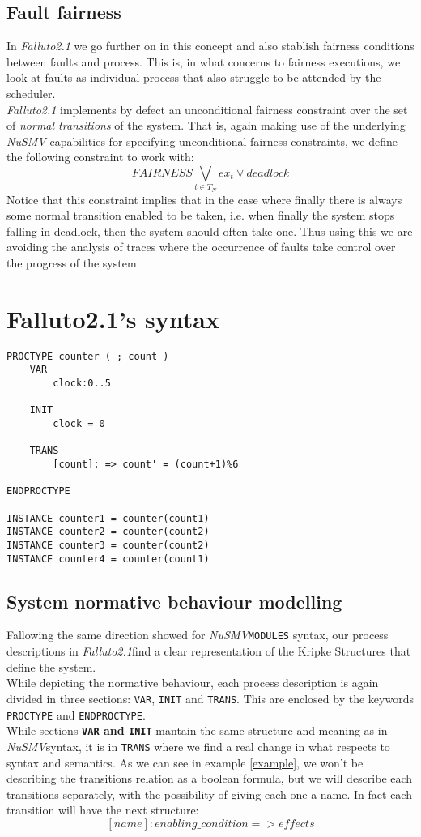 \documentclass[12pt]{article}
\newcommand{\nusmv}{\mbox{\textit{NuSMV}}}
\newcommand{\falluto}{\mbox{\textit{Falluto2.1}}}
\begin{document}
\subsection{Fault fairness}\label{fault fairness}
In \mbox{\textit{Falluto2.1}} we go further on in this concept and also 
stablish fairness conditions between faults and process. This is, in what
concerns to fairness executions, we look at faults as individual process
that also struggle to be attended by the scheduler.\\
\mbox{\textit{Falluto2.1}} implements by defect an unconditional fairness
constraint over the set of \textit{normal transitions} of the system. That
is, again making use of the underlying \mbox{\textit{NuSMV}} capabilities for
specifying unconditional fairness constraints, we define the following
constraint to work with: $$FAIRNESS \bigvee_{t \in T_N} ex_t \vee deadlock$$
Notice that this constraint implies that in the case where finally there is always some
normal transition enabled to be taken, i.e. when finally the system stops falling in deadlock, then the system should often take one.
Thus using this we are avoiding the analysis of traces where the occurrence of faults take
control over the progress of the system. 


\section{Falluto2.1's syntax}
\begin{verbatim}
PROCTYPE counter ( ; count )
    VAR
        clock:0..5

    INIT
        clock = 0

    TRANS
        [count]: => count' = (count+1)%6

ENDPROCTYPE

INSTANCE counter1 = counter(count1)
INSTANCE counter2 = counter(count2)
INSTANCE counter3 = counter(count2)
INSTANCE counter4 = counter(count1)

\end{verbatim}

\subsection{System normative behaviour modelling}
Fallowing the same direction showed for \nusmv \texttt{MODULES} syntax, our process descriptions in \falluto find a clear representation of the Kripke Structures that define the system.\\
While depicting the normative behaviour, each process description is again divided in three sections: \texttt{VAR}, \texttt{INIT} and \texttt{TRANS}. This are enclosed by the keywords \texttt{PROCTYPE} and \texttt{ENDPROCTYPE}.\\
While sections \textbf{\texttt{VAR} and \texttt{INIT}} mantain the same structure and meaning as in \nusmv syntax, it is in \texttt{TRANS} where we find a real change in what respects to syntax and semantics. As we can see in example \ref{example}, we won't be describing the transitions relation as a boolean formula, but we will describe each transitions separately, with the possibility of giving each one a name. In fact each transition will have the next structure: $$[name]: enabling\_condition => effects$$
\end{document}
